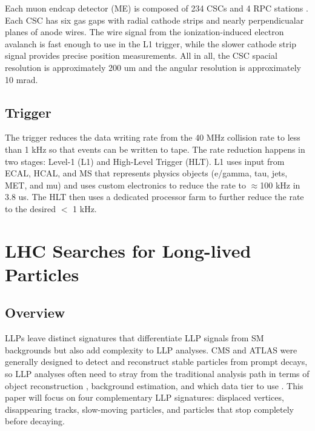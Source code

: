 \documentclass[12pt]{article}
\begin{document}
    Each muon endcap detector (ME) is composed of 234 CSCs and 4 RPC stations . Each CSC has six gas gaps with radial cathode strips and nearly perpendicualar planes of anode wires. The wire signal from the ionization-induced electron avalanch is fast enough to use in the L1 trigger, while the slower  cathode strip signal provides precise  position measurements. All in all, the CSC spacial resolution is approximately 200 um and the angular resolution is approximately 10 mrad.

\subsection{Trigger}
    The trigger reduces the data writing rate from the 40 MHz collision rate to less than 1 kHz so that events can be written to tape. The rate reduction happens in two stages: Level-1 (L1) and High-Level Trigger (HLT). L1 uses input from ECAL, HCAL, and MS that represents physics objects (e/gamma, tau, jets, MET, and mu) and uses custom electronics to reduce the rate to $\approx$100 kHz in 3.8 us. The HLT then uses a dedicated processor farm to further reduce the rate to the desired $<$ 1 kHz.

\section{LHC Searches for Long-lived Particles}
\subsection{Overview}
    LLPs leave distinct signatures that differentiate LLP signals from SM backgrounds but also add complexity to LLP analyses. CMS and ATLAS were generally designed to detect and reconstruct stable particles from prompt decays, so LLP analyses often need to stray from the traditional analysis path in terms of object reconstruction , background estimation, and which data tier to use . This paper will focus on four complementary LLP signatures: displaced vertices, disappearing tracks, slow-moving particles, and particles that stop completely before decaying.
\end{document}
